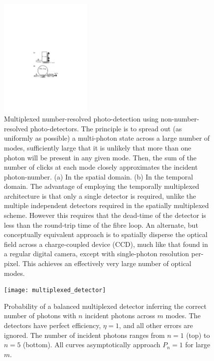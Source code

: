 \begin{figure}[!htbp]
\includegraphics[clip=true, width=0.4\textwidth]{detector_multiplexing}
\captionspacefig \caption{Multiplexed number-resolved photo-detection using non-number-resolved photo-detectors. The principle is to spread out (as uniformly as possible) a multi-photon state across a large number of modes, sufficiently large that it is unlikely that more than one photon will be present in any given mode. Then, the sum of the number of clicks at each mode closely approximates the incident photon-number. (a) In the spatial domain. (b) In the temporal domain. The advantage of employing the temporally multiplexed architecture is that only a single detector is required, unlike the multiple independent detectors required in the spatially multiplexed scheme. However this requires that the dead-time of the detector is less than the round-trip time of the fibre loop. An alternate, but conceptually equivalent approach is to spatially disperse the optical field across a charge-coupled device (CCD), much like that found in a regular digital camera, except with single-photon resolution per-pixel. This achieves an effectively very large number of optical modes.} \label{fig:det_mult}
\end{figure}

\begin{figure}[!htbp]
	\texttt{[image: multiplexed\_detector]}
	\captionspacefig \caption{Probability of a balanced multiplexed detector inferring the correct number of photons with $n$ incident photons across $m$ modes. The detectors have perfect efficiency, \mbox{$\eta=1$}, and all other errors are ignored. The number of incident photons ranges from \mbox{$n=1$} (top) to \mbox{$n=5$} (bottom). All curves asymptotically approach \mbox{$P_n=1$} for large $m$.}\label{fig:multiplexed_pd}
\end{figure}

